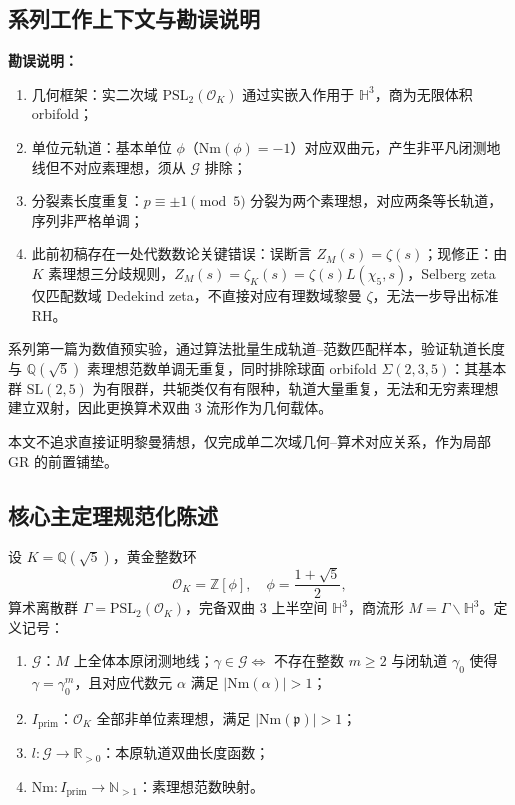 \documentclass[12pt,a4paper]{article}
\begin{document}
\subsection{系列工作上下文与勘误说明}

\textbf{勘误说明：}
\begin{enumerate}[label=\arabic*.]
\item 几何框架：实二次域 $\mathrm{PSL}_2(\mathcal{O}_K)$ 通过实嵌入作用于 $\mathbb{H}^3$，商为无限体积 orbifold；
\item 单位元轨道：基本单位 $\phi$（$\mathrm{Nm}(\phi) = -1$）对应双曲元，产生非平凡闭测地线但不对应素理想，须从 $\mathcal{G}$ 排除；
\item 分裂素长度重复：$p \equiv \pm 1 \pmod{5}$ 分裂为两个素理想，对应两条等长轨道，序列非严格单调；
\item 此前初稿存在一处代数数论关键错误：误断言 $Z_M(s) = \zeta(s)$；现修正：由 $K$ 素理想三分歧规则，$Z_M(s) = \zeta_K(s) = \zeta(s)L(\chi_5, s)$，Selberg zeta 仅匹配数域 Dedekind zeta，不直接对应有理数域黎曼 $\zeta$，无法一步导出标准 RH。
\end{enumerate}

系列第一篇为数值预实验，通过算法批量生成轨道--范数匹配样本，验证轨道长度与 $\mathbb{Q}(\sqrt{5})$ 素理想范数单调无重复，同时排除球面 orbifold $\Sigma(2,3,5)$：其基本群 $\mathrm{SL}(2,5)$ 为有限群，共轭类仅有有限种，轨道大量重复，无法和无穷素理想建立双射，因此更换算术双曲 3 流形作为几何载体。

本文不追求直接证明黎曼猜想，仅完成单二次域几何--算术对应关系，作为局部 GR 的前置铺垫。

\subsection{核心主定理规范化陈述}

设 $K = \mathbb{Q}(\sqrt{5})$，黄金整数环
\[
\mathcal{O}_K = \mathbb{Z}[\phi], \quad \phi = \frac{1+\sqrt{5}}{2},
\]
算术离散群 $\Gamma = \mathrm{PSL}_2(\mathcal{O}_K)$，完备双曲 3 上半空间 $\mathbb{H}^3$，商流形 $M = \Gamma\backslash\mathbb{H}^3$。定义记号：

\begin{enumerate}[label=\arabic*.]
\item $\mathcal{G}$：$M$ 上全体本原闭测地线；$\gamma \in \mathcal{G} \iff$ 不存在整数 $m \geq 2$ 与闭轨道 $\gamma_0$ 使得 $\gamma = \gamma_0^m$，且对应代数元 $\alpha$ 满足 $|\mathrm{Nm}(\alpha)| > 1$；
\item $I_{\mathrm{prim}}$：$\mathcal{O}_K$ 全部非单位素理想，满足 $|\mathrm{Nm}(\mathfrak{p})| > 1$；
\item $l: \mathcal{G} \to \mathbb{R}_{>0}$：本原轨道双曲长度函数；
\item $\mathrm{Nm}: I_{\mathrm{prim}} \to \mathbb{N}_{>1}$：素理想范数映射。
\end{enumerate}
\end{document}
